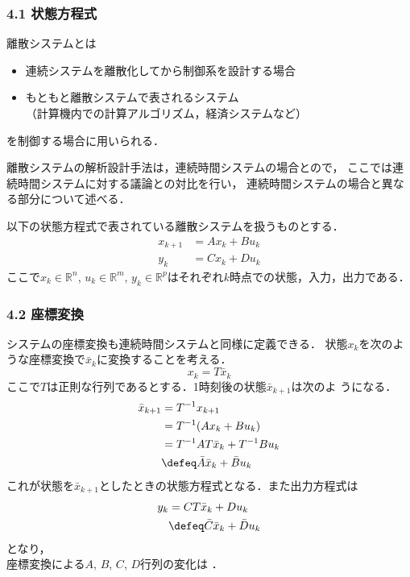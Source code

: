 

\begin{frame}[t]
\frametitle{4.1 状態方程式}
離散システムとは
\begin{itemize}
	\item 連続システムを離散化してから制御系を設計する場合
	\item もともと離散システムで表されるシステム\\
	（計算機内での計算アルゴリズム，経済システムなど）
\end{itemize}
を制御する場合に用いられる．

離散システムの解析設計手法は，連続時間システムの場合とので，
ここでは連続時間システムに対する議論との対比を行い，
連続時間システムの場合と異なる部分について述べる．

\vspace{5mm}

以下の状態方程式で表されている離散システムを扱うものとする．
\begin{align}
 x_{k+1} &= A x_k + B u_k \label{d_state_eq} \\
 y_k     &= C x_k + D u_k \label{d_output_eq}
\end{align}
ここで$x_k \in \mathbb{R}^n$, $u_k \in \mathbb{R}^m $, $y_k \in
\mathbb{R}^p $はそれぞれ$k$時点での状態，入力，出力である．
\end{frame}

\begin{frame}[t]
\frametitle{4.2 座標変換}
システムの座標変換も連続時間システムと同様に定義できる．
状態$x_k$を次のような座標変換で$\bar{x}_k$に変換することを考える．
\begin{equation}
 x_k = T \bar{x}_k
\end{equation}
ここで$T$は正則な行列であるとする．1時刻後の状態$\bar{x}_{k+1}$は次のよ
うになる．
\begin{align}
 \bar{x}_{k+1} &= T^{-1} x_{k+1} \nonumber \\
               &= T^{-1} ( A x_k + B u_k) \nonumber \\
               &= T^{-1} A T \bar{x}_k + T^{-1} B u_k \nonumber \\
               &\defeq \bar{A} \bar{x}_k + \bar{B} u_k
\end{align}
これが状態を$\bar{x}_{k+1}$としたときの状態方程式となる．また出力方程式は
\begin{align}
 y_k &= C T \bar{x}_k + D u_k \nonumber \\
     &\defeq \bar{C} \bar{x}_k + \bar{D} u_k
\end{align}
となり，\\
座標変換による$A$, $B$, $C$, $D$行列の変化は
．
\end{frame}

